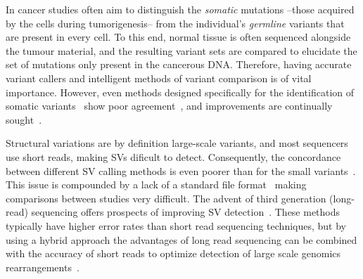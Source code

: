 \begin{justify}
In cancer studies often aim to distinguish the \emph{somatic} mutations --those acquired by the cells during tumorigenesis-- from the individual's \emph{germline} variants that are present in every cell. To this end, normal tissue is often sequenced alongside the tumour material, and the resulting variant sets are compared to elucidate the set of mutations only present in the cancerous DNA\@. Therefore, having accurate variant callers and intelligent methods of variant comparison is of vital importance. However, even methods designed specifically for the identification of somatic variants~\cite{xu2014comparison,kim2013comparing,roberts2013comparative} show poor agreement~\cite{alioto2015comprehensive, kroigaard2016evaluation, orawe2013}, and improvements are continually sought~\cite{callari2017,vijayan2017}.

Structural variations are by definition large-scale variants, and most sequencers use short reads, making SVs dificult to detect. Consequently, the concordance between different SV calling methods is even poorer than for the small variants~\cite{sedlazeck2017}. This issue is compounded by a lack of a standard file format~\cite{scherer2007} making comparisons between studies very difficult. The advent of third generation (long-read) sequencing offers prospects of improving SV detection~\cite{sedlazeck2018,merker2017}. These methods typically have higher error rates than short read sequencing techniques, but by using a hybrid approach the advantages of long read sequencing can be combined with the accuracy of short reads to optimize detection of large scale genomics rearrangements~\cite{fan2017hysa,weissensteiner2017, miller2017, ritz2014}.


\end{justify}
